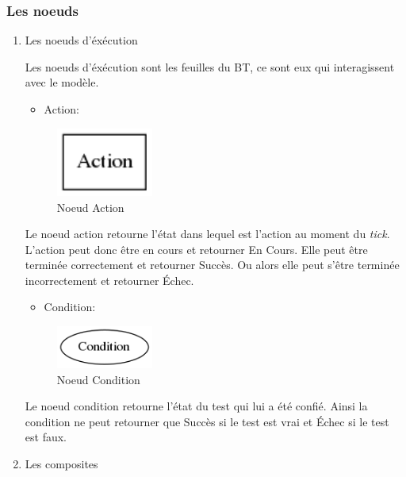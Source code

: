 \documentclass[11pt]{article}
\begin{document}
\subsubsection{Les noeuds}
\label{sec-2-1-2}
\begin{enumerate}
\item Les noeuds d'éxécution
\label{sec-2-1-2-1}

Les noeuds d'éxécution sont les feuilles du BT, ce sont eux qui interagissent avec le modèle.

\clearpage
\begin{itemize}
\item Action:
\end{itemize}

\begin{figure}[htb]
\centering
\includegraphics[width=0.3\textwidth]{./img/Action.png}
\caption{Noeud Action}
\end{figure}

Le noeud action retourne l'état dans lequel est l'action au moment du \emph{tick}.
L'action peut donc être en cours et retourner En Cours.
Elle peut être terminée correctement et retourner Succès.
Ou alors elle peut s'être terminée incorrectement et retourner Échec.

\begin{itemize}
\item Condition:
\end{itemize}


\begin{figure}[htb]
\centering
\includegraphics[width=0.3\textwidth]{./img/Condition.png}
\caption{Noeud Condition}
\end{figure}

Le noeud condition retourne l'état du test qui lui a été confié.
Ainsi la condition ne peut retourner que Succès si le test est vrai et Échec si le test est faux.

\item Les composites
\label{sec-2-1-2-2}


\end{enumerate}
\end{document}
